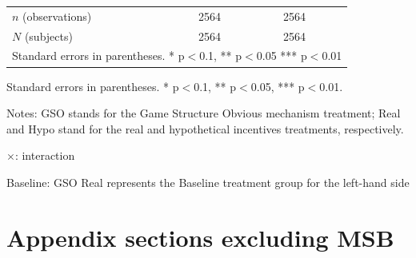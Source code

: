 \documentclass[12pt]{article}
\begin{document}
\begin{table}[H]
{\begin{tabular}{l*{2}{cc}}
\hline
\(n \) (observations)      &        2564         &            &        2564         &            \\
\(N \) (subjects)      &        2564         &            &        2564         &            \\
\hline\hline
\multicolumn{5}{l}{\footnotesize Standard errors in parentheses. * p$<$0.1, ** p$<$0.05 *** p$<$0.01}\\
\end{tabular}
}




\begin{tablenotes}
            \footnotesize
            \item Standard errors in parentheses. * p$<$0.1, ** p$<$0.05, *** p$<$0.01.
            \item Notes: GSO stands for the Game Structure Obvious mechanism treatment; Real and Hypo stand for the real and hypothetical incentives treatments, respectively.
           \item $\times$: interaction
           \item Baseline: GSO Real represents the Baseline treatment group for the left-hand side
        \end{tablenotes}
\end{table}

\clearpage





\clearpage
\section{Appendix sections excluding MSB}
\end{document}
